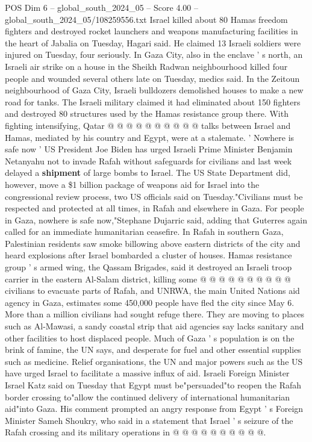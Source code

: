 \begin{textsample}{POS Dim 6 – global\_south\_2024\_05 – Score 4.00 – global\_south\_2024\_05/108259556.txt}
Israel killed about 80 Hamas freedom fighters and destroyed rocket launchers and weapons manufacturing facilities in the heart of Jabalia on Tuesday, Hagari said.
He claimed 13 Israeli soldiers were injured on Tuesday, four seriously.
In Gaza City, also in the enclave ' s north, an Israeli air strike on a house in the Sheikh Radwan neighbourhood killed four people and wounded several others late on Tuesday, medics said.
In the Zeitoun neighbourhood of Gaza City, Israeli bulldozers demolished houses to make a new road for tanks.
The Israeli military claimed it had eliminated about 150 fighters and destroyed 80 structures used by the Hamas resistance group there.
With fighting intensifying, Qatar @ @ @ @ @ @ @ @ @ @ talks between Israel and Hamas, mediated by his country and Egypt, were at a stalemate. ' Nowhere is safe now ' US President Joe Biden has urged Israeli Prime Minister Benjamin Netanyahu not to invade Rafah without safeguards for civilians and last week delayed a \textbf{shipment} of large bombs to Israel.
The US State Department did, however, move a \$1 billion package of weapons aid for Israel into the congressional review process, two US officials said on Tuesday."Civilians must be respected and protected at all times, in Rafah and elsewhere in Gaza.
For people in Gaza, nowhere is safe now,"Stephane Dujarric said, adding that Guterres again called for an immediate humanitarian ceasefire.
In Rafah in southern Gaza, Palestinian residents saw smoke billowing above eastern districts of the city and heard explosions after Israel bombarded a cluster of houses.
Hamas resistance group ' s armed wing, the Qassam Brigades, said it destroyed an Israeli troop carrier in the eastern Al-Salam district, killing some @ @ @ @ @ @ @ @ @ @ civilians to evacuate parts of Rafah, and UNRWA, the main United Nations aid agency in Gaza, estimates some 450,000 people have fled the city since May 6.
More than a million civilians had sought refuge there.
They are moving to places such as Al-Mawasi, a sandy coastal strip that aid agencies say lacks sanitary and other facilities to host displaced people.
Much of Gaza ' s population is on the brink of famine, the UN says, and desperate for fuel and other essential supplies such as medicine.
Relief organisations, the UN and major powers such as the US have urged Israel to facilitate a massive influx of aid.
Israeli Foreign Minister Israel Katz said on Tuesday that Egypt must be"persuaded"to reopen the Rafah border crossing to"allow the continued delivery of international humanitarian aid"into Gaza.
His comment prompted an angry response from Egypt ' s Foreign Minister Sameh Shoukry, who said in a statement that Israel ' s seizure of the Rafah crossing and its military operations in @ @ @ @ @ @ @ @ @ @.

\end{textsample}
